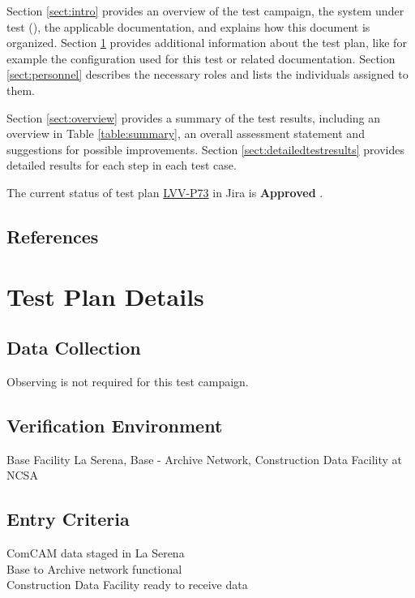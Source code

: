 \documentclass[DM,lsstdraft,STR,toc]{lsstdoc}
\begin{document}
Section \ref{sect:intro} provides an overview of the test campaign, the system under test (\product{}),
the applicable documentation, and explains how this document is organized.
Section \ref{sect:testplan} provides additional information about the test plan, like for example the configuration
used for this test or related documentation.
Section \ref{sect:personnel} describes the necessary roles and lists the individuals assigned to them.

Section \ref{sect:overview} provides a summary of the test results, including an overview in Table \ref{table:summary},
an overall assessment statement and suggestions for possible improvements.
Section \ref{sect:detailedtestresults} provides detailed results for each step in each test case.

The current status of test plan \href{https://jira.lsstcorp.org/secure/Tests.jspa\#/testPlan/LVV-P73}{LVV-P73} in Jira is \textbf{ Approved }.

\subsection{References}
\label{sect:references}
\renewcommand{\refname}{}



\newpage
\section{Test Plan Details}
\label{sect:testplan}


\subsection{Data Collection}

  Observing is not required for this test campaign.

\subsection{Verification Environment}
\label{sect:hwconf}
  Base Facility La Serena, Base - Archive Network, Construction Data
Facility at NCSA

  \subsection{Entry Criteria}
  ComCAM data staged in La Serena\\
Base to Archive network functional\\
Construction Data Facility ready to receive data
\end{document}
